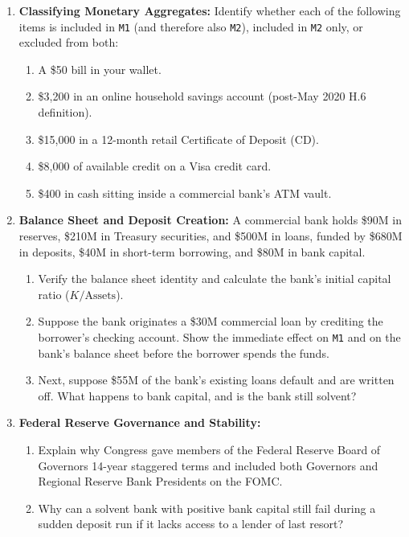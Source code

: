 \documentclass[11pt, oneside]{book}
\begin{document}
\begin{enumerate}[leftmargin=1.5em, itemsep=6pt]
  \item \textbf{Classifying Monetary Aggregates:} Identify whether each of the following items is included in \texttt{M1} (and therefore also \texttt{M2}), included in \texttt{M2} only, or excluded from both:
  \begin{enumerate}[label=(\alph*), itemsep=2pt]
    \item A \$50 bill in your wallet.
    \item \$3,200 in an online household savings account (post-May 2020 H.6 definition).
    \item \$15,000 in a 12-month retail Certificate of Deposit (CD).
    \item \$8,000 of available credit on a Visa credit card.
    \item \$400 in cash sitting inside a commercial bank's ATM vault.
  \end{enumerate}

  \item \textbf{Balance Sheet and Deposit Creation:} A commercial bank holds \$90M in reserves, \$210M in Treasury securities, and \$500M in loans, funded by \$680M in deposits, \$40M in short-term borrowing, and \$80M in bank capital.
  \begin{enumerate}[label=(\alph*), itemsep=2pt]
    \item Verify the balance sheet identity and calculate the bank's initial capital ratio ($K / \text{Assets}$).
    \item Suppose the bank originates a \$30M commercial loan by crediting the borrower's checking account. Show the immediate effect on \texttt{M1} and on the bank's balance sheet before the borrower spends the funds.
    \item Next, suppose \$55M of the bank's existing loans default and are written off. What happens to bank capital, and is the bank still solvent?
  \end{enumerate}

  \item \textbf{Federal Reserve Governance and Stability:}
  \begin{enumerate}[label=(\alph*), itemsep=2pt]
    \item Explain why Congress gave members of the Federal Reserve Board of Governors 14-year staggered terms and included both Governors and Regional Reserve Bank Presidents on the FOMC.
    \item Why can a solvent bank with positive bank capital still fail during a sudden deposit run if it lacks access to a lender of last resort?
  \end{enumerate}
\end{enumerate}
\end{document}
